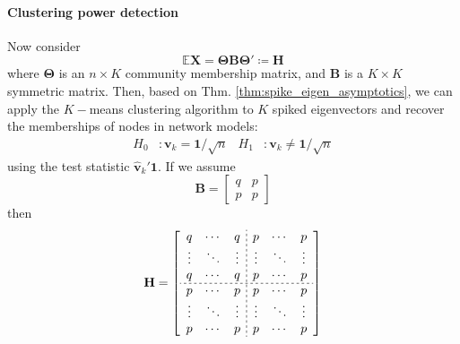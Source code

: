 \documentclass[twoside]{article}
\begin{document}
\paragraph*{Clustering power detection} Now consider 
$$
\mathbb{E}\mathbf{X} = \boldsymbol{\Theta \mathbf{B} \Theta}' \coloneq \mathbf{H}
$$
where $\boldsymbol{\Theta}$ is an $n\times K $ community membership matrix, and $\mathbf{B}$ is a $K\times K$ symmetric matrix. Then, based on Thm. \ref{thm:spike_eigen_asymptotics}, we can apply the $K-$means clustering algorithm to $K$ spiked eigenvectors and recover the memberships of nodes in network models:
\begin{align*}
    H_0 &: \mathbf{v}_k = \mathbf{1}/\sqrt{n} & H_1 &: \mathbf{v}_k  \neq \mathbf{1}/\sqrt{n}
\end{align*}
using the test statistic $\hat{\mathbf{v}}_k'\mathbf{1}$.  If we assume 
$$
\mathbf{B} = \begin{bmatrix}
    q & p \\
    p & p
\end{bmatrix}
$$
then 
$$
\mathbf{H} = \left[
    \begin{array}{ccc;{2pt/2pt}ccc}
        q & \cdots & q & p & \cdots & p \\ 
        \vdots & \ddots & \vdots & \vdots & \ddots & \vdots \\
        q & \cdots & q & p & \cdots & p \\ \hdashline[2pt/2pt]
        p & \cdots & p & p & \cdots & p \\
        \vdots & \ddots & \vdots & \vdots & \ddots & \vdots \\
        p & \cdots & p & p & \cdots & p
    \end{array}
\right]
$$

\newpage


\end{document}
